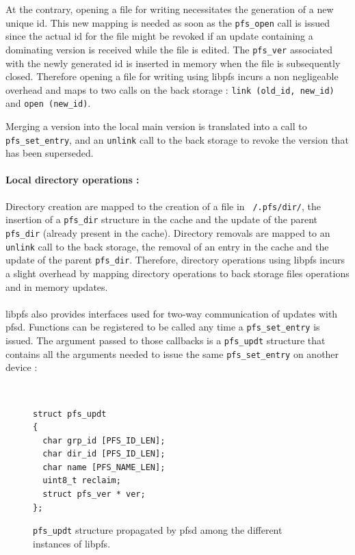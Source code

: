 At the contrary, opening a file for writing necessitates the
generation of a new unique id. This new mapping is needed as soon as
the {\tt pfs\_open} call is issued since the actual id for the file
might be revoked if an update containing a dominating version is
received while the file is edited. The {\tt pfs\_ver} associated with
the newly generated id is inserted in memory when the file is
subsequently closed. Therefore opening a file for writing using libpfs
incurs a non negligeable overhead and maps to two calls on the back
storage : {\tt link (old\_id, new\_id)} and {\tt open (new\_id)}.

Merging a version into the local main version is translated into a
call to {\tt pfs\_set\_entry}, and an {\tt unlink} call to the back
storage to revoke the version that has been superseded.

\paragraph{Local directory operations :}
Directory creation are mapped to the creation of a file in {\tt
  /.pfs/dir/}, the insertion of a {\tt pfs\_dir} structure in the
cache and the update of the parent {\tt pfs\_dir} (already present in
the cache). Directory removals are mapped to an {\tt unlink} call to
the back storage, the removal of an entry in the cache and the update
of the parent {\tt pfs\_dir}. Therefore, directory operations using
libpfs incurs a slight overhead by mapping directory operations to
back storage files operations and in memory updates.

\paragraph{}

libpfs also provides interfaces used for two-way communication of
updates with pfsd. Functions can be registered to be called
any time a {\tt pfs\_set\_entry} is issued. The argument passed to
those callbacks is a {\tt pfs\_updt} structure that contains all the
arguments needed to issue the same {\tt pfs\_set\_entry} on another
device :

\begin{figure}[ht]
\begin{center}
{\tt \small
\begin{verbatim}
struct pfs_updt
{
  char grp_id [PFS_ID_LEN];
  char dir_id [PFS_ID_LEN];  
  char name [PFS_NAME_LEN];
  uint8_t reclaim;
  struct pfs_ver * ver;
};
\end{verbatim}
}
\end{center}
\caption{\label{MemStruct}
{\small {\tt pfs\_updt} structure propagated by pfsd among the
    different instances of libpfs.}}
\end{figure}

